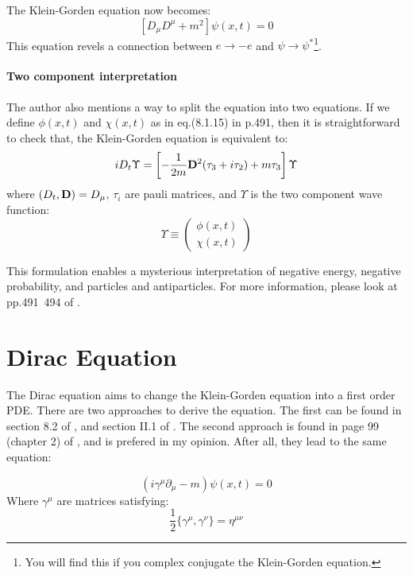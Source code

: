 \documentclass{article}
\begin{document}
The Klein-Gorden equation now becomes:
\begin{equation}
    \label{eq:kg-emfield}
    [D_\mu D^\mu+m^2] \psi(x,t) = 0
\end{equation}
This equation revels a connection between $e\to-e$ and
$\psi\to\psi^*$\footnote{You will find this if you complex conjugate
the Klein-Gorden equation.}.

\paragraph{Two component interpretation} The author also mentions a
way to split the equation into two equations. If we define $\phi(x,t)$
and $\chi(x,t)$ as in eq.(8.1.15) in p.491, then it is straightforward
to check that, the Klein-Gorden equation is equivalent to:
\begin{equation}
    iD_t \Upsilon = \left[
    -\frac{1}{2m}\vb{D}^2(\tau_3+i\tau_2)+m\tau_3 \right] \Upsilon
\end{equation}
where $(D_t,\vb{D})=D_\mu$, $\tau_i$ are pauli matrices, and $\Upsilon$ is the
two component wave function:
\begin{equation}
    \Upsilon \equiv \begin{pmatrix}
        \phi(x,t) \\ \chi(x,t)
    \end{pmatrix}
\end{equation}

This formulation enables a mysterious interpretation of negative energy,
negative probability, and particles and antiparticles. For more information,
please look at pp.491~494 of \cite{Sakurai2011}.

\section{Dirac Equation}
\label{sec:Dirac Equation}

The Dirac equation aims to change the Klein-Gorden equation into a first order
PDE. There are two approaches to derive the equation. The first can be found in
section 8.2 of \cite{Sakurai2011}, and section II.1 of \cite{zee2010quantum}.
The second approach is found in page 99 (chapter 2) of \cite{Greiner1997}, and
is prefered in my opinion. After all, they lead to the same equation:

\begin{equation}
    (i\gamma^\mu \partial_\mu - m) \psi(x,t) =0
    \label{eq:dirac-eq}
\end{equation}
Where $\gamma^\mu$ are matrices satisfying:
\begin{equation}
    \frac{1}{2}\{ \gamma^\mu,\gamma^\nu\} = \eta^{\mu\nu}
\end{equation}
\end{document}
